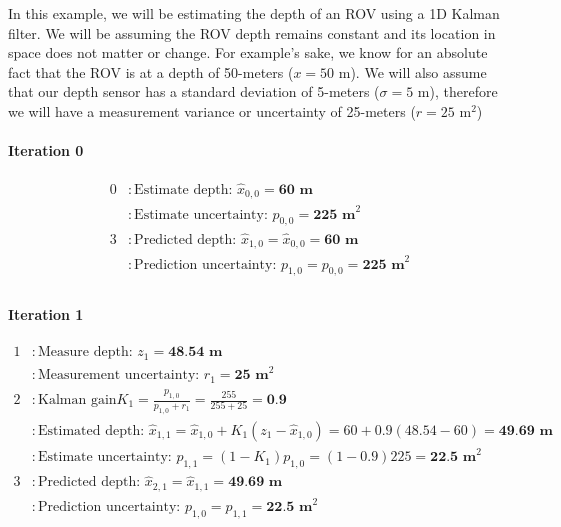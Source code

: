         \begin{example}
            In this example, we will be estimating the depth of an ROV using a 1D Kalman filter.
            We will be assuming the ROV depth remains constant and its location in space does not matter or change.
            For example's sake, we know for an absolute fact that the ROV is at a depth of 50-meters ($x=50 \text{ m}$).
            We will also assume that our depth sensor has a standard deviation of 5-meters ($\sigma=5 \text{ m}$), therefore we will have a measurement variance or uncertainty of 25-meters ($r=25 \text{ m}^2$)

            \paragraph*{Iteration 0}
            \begin{equation*}
                \begin{aligned}
                    0 &: \text{Estimate depth: } \hat{x}_{0,0} = \textbf{60 m} \\
                      &: \text{Estimate uncertainty: } p_{0,0} = \textbf{225 m}^2 \\
                    3 &: \text{Predicted depth: } \hat{x}_{1,0} = \hat{x}_{0,0} = \textbf{60 m} \\
                      &: \text{Prediction uncertainty: } p_{1,0} = p_{0,0} = \textbf{225 m}^2 \\
                \end{aligned}
            \end{equation*}

            \paragraph*{Iteration 1}
            \begin{equation*}
                \begin{aligned}
                    1 &: \text{Measure depth: } z_1 = \textbf{48.54 m} \\
                      &: \text{Measurement uncertainty: } r_1 = \textbf{25 m}^2 \\
                    2 &: \text{Kalman gain} K_1 = \frac{p_{1,0}}{p_{1,0}+r_1} = \frac{255}{255 + 25} = \textbf{0.9} \\
                      &: \text{Estimated depth: } \hat{x}_{1,1} = \hat{x}_{1,0} + K_1(z_1 - \hat{x}_{1,0}) = 60 + 0.9(48.54-60) = \textbf{49.69 m} \\
                      &: \text{Estimate uncertainty: } p_{1,1} = (1-K_1)p_{1,0} = (1-0.9)225 = \textbf{22.5 m}^2 \\
                    3 &: \text{Predicted depth: } \hat{x}_{2,1} = \hat{x}_{1,1} = \textbf{49.69 m} \\
                      &: \text{Prediction uncertainty: } p_{1,0} = p_{1,1} = \textbf{22.5 m}^2 \\
                \end{aligned}
            \end{equation*}


\end{example}
